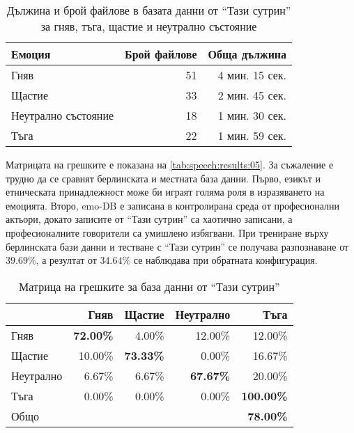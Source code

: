 \documentclass[main.tex]{subfiles}
\begin{document}
\begin{table}[ht]
    \begin{center}
    \begin{tabular}{|l|r|r|} 
        \hline
        Емоция & Брой файлове & Обща дължина\\ 
        \hline
        Гняв & 51 & 4 мин. 15 сек.\\ 
        Щастие &  33 & 2 мин. 45 сек.\\ 
        Неутрално състояние &  18 & 1 мин. 30 сек.\\ 
        Тъга &  22 & 1 мин. 59 сек.\\ 
        \hline
    \end{tabular}
    \caption{Дължина и брой файлове в базата данни от ``Тази сутрин'' за гняв, тъга, щастие и неутрално състояние}
    \label{tab:speech:results:04}
    \end{center}
\end{table}
Матрицата на грешките е показана на \autoref{tab:speech:results:05}.
За съжаление е трудно да се сравнят берлинската и местната база данни. Първо, езикът и етническата принадлежност може би играят голяма роля в изразяването на емоцията. Второ, emo-DB е записана в контролирана среда от професионални актьори, докато записите от ``Тази сутрин'' са хаотично записани, а професионалните говорители са умишлено избягвани. При трениране върху берлинската бази данни и тестване с ``Тази сутрин'' се получава разпознаване от $39.69\%$, а резултат от $34.64\%$ се наблюдава при обратната конфигурация.
\begin{table}[h]
    \begin{center}
    \begin{tabular}{|l|r r r r|} 
        \hline
        & Гняв & Щастие & Неутрално & Тъга \\ 
        \hline
        Гняв &  \textbf{72.00\%} & 4.00\% & 12.00\% & 12.00\% \\ 
        Щастие & 10.00\% & \textbf{73.33\%} & 0.00\% & 16.67\% \\ 
        Неутрално & 6.67\% & 6.67\% & \textbf{67.67\%} & 20.00\% \\ 
        Тъга & 0.00\% & 0.00\% & 0.00\% & \textbf{100.00\%}\\ 
        \hline
        Общо & & & & \textbf{78.00\%}\\
        \hline
    \end{tabular}
    \caption{Матрица на грешките за база данни от ``Тази сутрин''}
    \label{tab:speech:results:05}
    \end{center}
\end{table}
\end{document}
